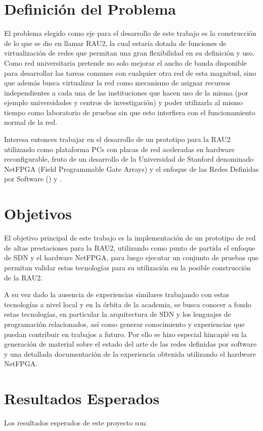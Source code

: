 \section{Definición del Problema}

El problema elegido como eje para el desarrollo de este trabajo es la construcción de lo que se dio en llamar RAU2, la cual estaría dotada de funciones de virtualización de redes que permitan una gran flexibilidad en su definición y uso. Como red universitaria pretende no solo mejorar el ancho de banda disponible para desarrollar las tareas comunes con cualquier otra red de esta magnitud, sino que además busca virtualizar la red como mecanismo de asignar recursos independientes a cada una de las instituciones que hacen uso de la misma (por ejemplo universidades y centros de investigación) y poder utilizarla al mismo tiempo como laboratorio de pruebas sin que esto interfiera con el funcionamiento normal de la red.

Interesa entonces trabajar en el desarrollo de un prototipo para la RAU2 utilizando como plataforma PCs con placas de red aceleradas en hardware reconfigurable, fruto de un desarrollo de la Universidad de Stanford denominado NetFPGA (Field Programmable Gate Arrays) \citep{NetFPGA} y el enfoque de las Redes Definidas por Software () \citep{gude2008nox} y \citep{SDNReadingList}.

\section{Objetivos}
El objetivo principal de este trabajo es la implementación de un prototipo de red de altas prestaciones para la RAU2, utilizando como punto de partida el enfoque de SDN y el hardware NetFPGA, para luego ejecutar un conjunto de pruebas que permitan validar estas tecnologías para su utilización en  la posible construcción de la RAU2.

A su vez dado la ausencia de experiencias similares trabajando con estas tecnologías a nivel local y en la órbita de la academia, se busca conocer a fondo estas tecnologías, en particular la arquitectura de SDN y los lenguajes de programación relacionados, así como generar conocimiento y experiencias que puedan contribuir en trabajos a futuro. Por ello se hizo especial hincapié en la generación de  material sobre el estado del arte de las redes definidas por software y una detallada documentación de la experiencia obtenida utilizando el hardware NetFPGA.

\section{Resultados Esperados}
Los resultados esperados de este proyecto son:

